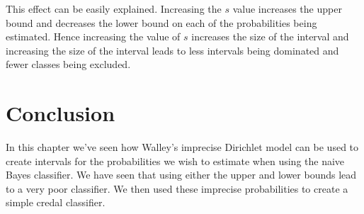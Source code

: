 This effect can be easily explained.
Increasing the $s$ value increases the upper bound and decreases the lower bound on each of the probabilities being estimated.
Hence increasing the value of $s$ increases the size of the interval and increasing the size of the interval leads to less intervals being dominated and fewer classes being excluded.

\section{Conclusion}

In this chapter we've seen how Walley's imprecise Dirichlet model can be used to create intervals for the probabilities we wish to estimate when using the naive Bayes classifier.
We have seen that using either the upper and lower bounds lead to a very poor classifier.
We then used these imprecise probabilities to create a simple credal classifier.